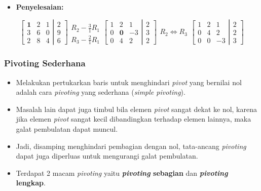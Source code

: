 \documentclass[pdflatex,compress,mathserif]{beamer}
\begin{document}
\begin{frame}
	\begin{itemize}
		\item \textbf{Penyelesaian:}
	\end{itemize}
	
	\[
	\left[
		\begin{matrix}
			\textbf{1} & 2 & 1 \\
			3 & 6 & 0 \\
			2 & 8 & 4
		\end{matrix}
	\right|
	\left.
		\begin{matrix}
			2 \\
			9 \\
			6
		\end{matrix}
	\right]
	\begin{matrix}
		\\
		R_2 - \frac{3}{1}R_1 \\
		R_3 - \frac{2}{1}R_1
	\end{matrix}
	\left[
		\begin{matrix}
			1 & 2 & 1 \\
			0 & \textbf{0} & -3 \\
			0 & 4 & 2
		\end{matrix}
	\right|
	\left.
		\begin{matrix}
			2 \\
			3 \\
			2
		\end{matrix}
	\right]
	\begin{matrix}
	\\
	R_2 \Leftrightarrow R_3\\
	\end{matrix}
	\left[
	\begin{matrix}
	1 & 2 & 1 \\
	0 & 4 & 2 \\
	0 & 0 & -3
	\end{matrix}
	\right|
	\left.
	\begin{matrix}
	2 \\
	2 \\
	3
	\end{matrix}
	\right]
	\]
\end{frame}

\begin{frame}
	\frametitle{Pivoting Sederhana}
	\begin{itemize}
		\item Melakukan pertukarkan baris untuk menghindari \textit{pivot} yang bernilai nol adalah cara \textit{pivoting} yang sederhana (\textit{simple pivoting}).
		\item Masalah lain dapat juga timbul bila elemen \textit{pivot} sangat dekat ke nol, karena jika elemen \textit{pivot} sangat kecil dibandingkan terhadap elemen lainnya, maka galat pembulatan dapat muncul.
		\item Jadi, disamping menghindari pembagian dengan nol, tata-ancang \textit{pivoting} dapat juga diperluas untuk mengurangi galat pembulatan.
		\item Terdapat 2 macam \textit{pivoting} yaitu \textbf{\textit{pivoting} sebagian} dan \textbf{\textit{pivoting} lengkap}.
	\end{itemize}
\end{frame}
\end{document}
